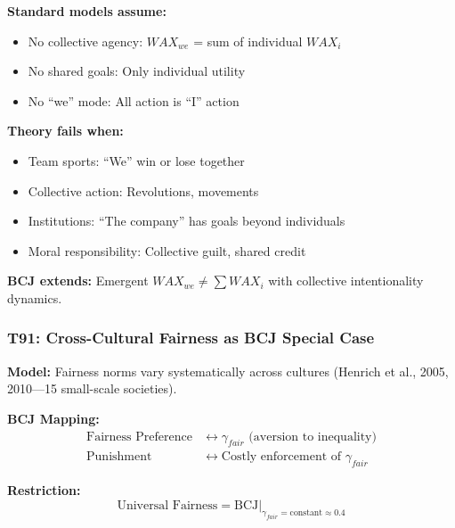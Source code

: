 \begin{tcolorbox}[colback=red!5!white, colframe=red!75!black,
    title=Boundary Condition: Where Individual Aggregation Fails]
\textbf{Standard models assume:}
\begin{itemize}[nosep]
\item No collective agency: $WAX_{we}$ = sum of individual $WAX_i$
\item No shared goals: Only individual utility
\item No ``we'' mode: All action is ``I'' action
\end{itemize}

\textbf{Theory fails when:}
\begin{itemize}[nosep]
\item Team sports: ``We'' win or lose together
\item Collective action: Revolutions, movements
\item Institutions: ``The company'' has goals beyond individuals
\item Moral responsibility: Collective guilt, shared credit
\end{itemize}

\textbf{BCJ extends:} Emergent $WAX_{we} \neq \sum WAX_i$ with collective intentionality dynamics.
\end{tcolorbox}

\subsubsection*{T91: Cross-Cultural Fairness as BCJ Special Case}

\textbf{Model:} Fairness norms vary systematically across cultures (Henrich et al., 2005, 2010---15 small-scale societies).

\textbf{BCJ Mapping:}
\begin{align}
\text{Fairness Preference} &\leftrightarrow \gamma_{fair} \text{ (aversion to inequality)} \\
\text{Punishment} &\leftrightarrow \text{Costly enforcement of } \gamma_{fair}
\end{align}

\textbf{Restriction:}
\begin{equation}
\text{Universal Fairness} = \text{BCJ} \big|_{\gamma_{fair} = \text{constant} \approx 0.4}
\end{equation}

